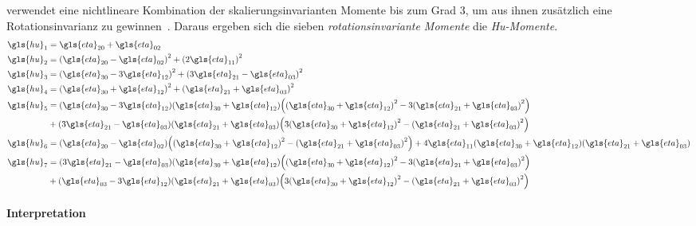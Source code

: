 \citeauthor{Hu} verwendet eine nichtlineare Kombination der skalierungsinvarianten Momente bis zum Grad $3$, um aus ihnen zusätzlich eine Rotationsinvarianz zu gewinnen~\cite{Hu, momente}.
Daraus ergeben sich die sieben \emph{rotationsinvariante Momente} \bzw{} die \emph{Hu-Momente}.
\begin{equation*}
\begin{split}
  \gls{hu}_1 & = \gls{eta}_{20} + \gls{eta}_{02}\\
  \gls{hu}_2 & = {\left(\gls{eta}_{20} - \gls{eta}_{02}\right)}^2 + {\left(2\gls{eta}_{11}\right)}^2\\
  \gls{hu}_3 & = {\left(\gls{eta}_{30} - 3\gls{eta}_{12}\right)}^2 + {\left(3\gls{eta}_{21} - \gls{eta}_{03}\right)}^2\\
  \gls{hu}_4 & = {\left(\gls{eta}_{30} + \gls{eta}_{12}\right)}^2 + {\left(\gls{eta}_{21} + \gls{eta}_{03}\right)}^2\\
  \gls{hu}_5 & = \left(\gls{eta}_{30} - 3\gls{eta}_{12}\right)\left(\gls{eta}_{30} + \gls{eta}_{12}\right) \left({\left(\gls{eta}_{30} + \gls{eta}_{12}\right)}^2 - 3{\left(\gls{eta}_{21} + \gls{eta}_{03}\right)}^2\right)\\
  & + \left(3\gls{eta}_{21} - \gls{eta}_{03}\right)\left(\gls{eta}_{21} + \gls{eta}_{03}\right) \left(3{\left(\gls{eta}_{30} + \gls{eta}_{12}\right)}^2 - {\left(\gls{eta}_{21} + \gls{eta}_{03}\right)}^2\right)\\
  \gls{hu}_6 & = \left(\gls{eta}_{20} - \gls{eta}_{02}\right)\left({\left(\gls{eta}_{30} + \gls{eta}_{12}\right)}^2 - {\left(\gls{eta}_{21} + \gls{eta}_{03}\right)}^2\right) + 4\gls{eta}_{11}\left(\gls{eta}_{30} + \gls{eta}_{12}\right)\left(\gls{eta}_{21} + \gls{eta}_{03}\right)\\
  \gls{hu}_7 & = \left(3\gls{eta}_{21} - \gls{eta}_{03}\right)\left(\gls{eta}_{30} + \gls{eta}_{12}\right) \left({\left(\gls{eta}_{30} + \gls{eta}_{12}\right)}^2 - 3{\left(\gls{eta}_{21} + \gls{eta}_{03}\right)}^2\right)\\
  & + \left(\gls{eta}_{03} - 3\gls{eta}_{12}\right)\left(\gls{eta}_{21} + \gls{eta}_{03}\right) \left(3{\left(\gls{eta}_{30} + \gls{eta}_{12}\right)}^2 - {\left(\gls{eta}_{21} + \gls{eta}_{03}\right)}^2\right)
\end{split}
\end{equation*}

\paragraph{Interpretation}
\label{interpretation_momente}

